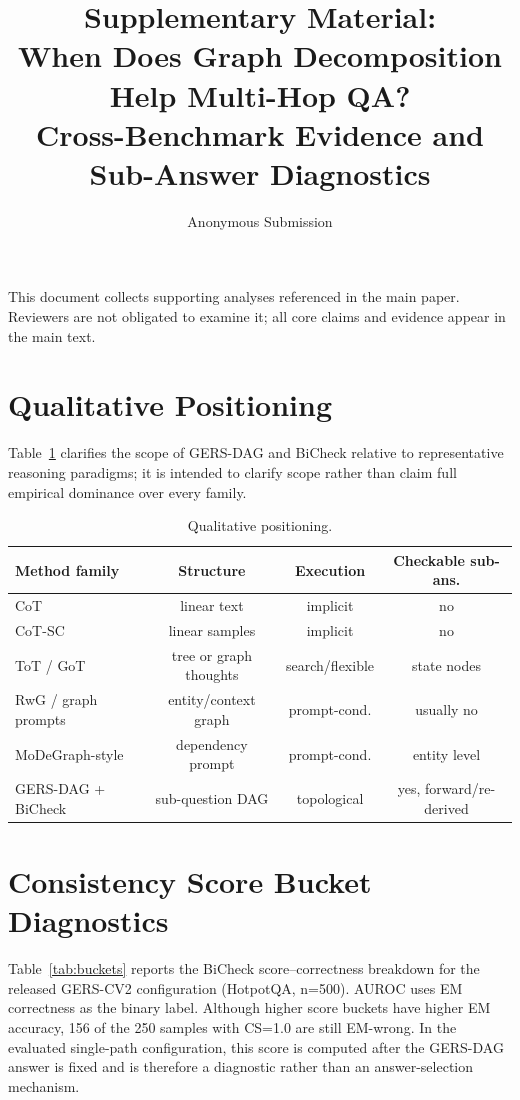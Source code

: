 \documentclass[11pt]{article}
\title{Supplementary Material:\\When Does Graph Decomposition Help Multi-Hop QA?\\Cross-Benchmark Evidence and Sub-Answer Diagnostics}
\author{Anonymous Submission}
\date{}
\begin{document}
\maketitle

This document collects supporting analyses referenced in the main paper. Reviewers are not obligated to examine it; all core claims and evidence appear in the main text.

\section{Qualitative Positioning}

Table~\ref{tab:position} clarifies the scope of GERS-DAG and BiCheck relative to representative reasoning paradigms; it is intended to clarify scope rather than claim full empirical dominance over every family.

\begin{table}[h]
\centering
\caption{Qualitative positioning.}
\label{tab:position}
\small
\begin{tabular}{lccc}
\toprule
Method family & Structure & Execution & Checkable sub-ans. \\
\midrule
CoT & linear text & implicit & no \\
CoT-SC & linear samples & implicit & no \\
ToT / GoT & tree or graph thoughts & search/flexible & state nodes \\
RwG / graph prompts & entity/context graph & prompt-cond. & usually no \\
MoDeGraph-style & dependency prompt & prompt-cond. & entity level \\
GERS-DAG + BiCheck & sub-question DAG & topological & yes, forward/re-derived \\
\bottomrule
\end{tabular}
\end{table}

\section{Consistency Score Bucket Diagnostics}

Table~\ref{tab:buckets} reports the BiCheck score--correctness breakdown for the released GERS-CV2 configuration (HotpotQA, n=500). AUROC uses EM correctness as the binary label. Although higher score buckets have higher EM accuracy, 156 of the 250 samples with CS=1.0 are still EM-wrong. In the evaluated single-path configuration, this score is computed after the GERS-DAG answer is fixed and is therefore a diagnostic rather than an answer-selection mechanism.
\end{document}
